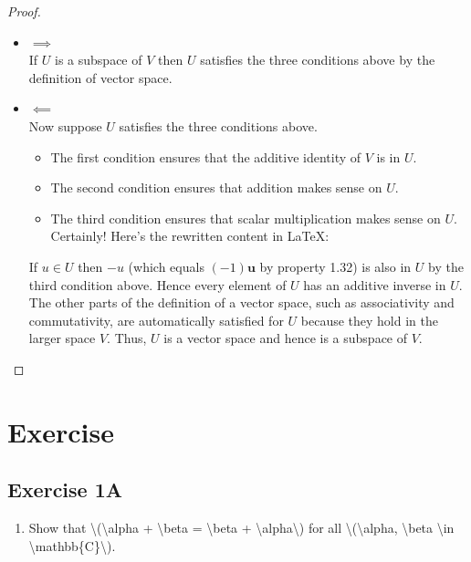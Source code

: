 \documentclass[
]{book}
\providecommand{\tightlist}{%
  \setlength{\itemsep}{0pt}\setlength{\parskip}{0pt}}
\theoremstyle{definition}
\theoremstyle{definition}
\theoremstyle{definition}
\theoremstyle{definition}
\theoremstyle{remark}
\begin{document}
\begin{proof}
\leavevmode

\begin{itemize}
\item
  \(\implies\)\\
  If \(U\) is a subspace of \(V\) then \(U\)
  satisfies the three conditions above by the
  definition of vector space.
\item
  \(\impliedby\)\\
  Now suppose \(U\) satisfies the three conditions above.

  \begin{itemize}
  \tightlist
  \item
    The first condition ensures that the additive identity of \(V\) is in \(U\).
  \item
    The second condition ensures that addition makes sense on \(U\).
  \item
    The third condition ensures that scalar multiplication makes sense on \(U\).
    Certainly! Here's the rewritten content in LaTeX:
  \end{itemize}

  If \({u} \in U\) then \(-{u}\) (which equals \((-1)\mathbf{u}\) by property 1.32) is also in \(U\) by the third condition above. Hence every element of \(U\) has an additive inverse in \(U\). The other parts of the definition of a vector space, such as associativity and commutativity, are automatically satisfied for \(U\) because they hold in the larger space \(V\). Thus, \(U\) is a vector space and hence is a subspace of \(V\).
\end{itemize}

\end{proof}

\chapter{Exercise}\label{exercise}

\section{Exercise 1A}\label{exercise-1a}

\begin{enumerate}
\def\labelenumi{\arabic{enumi}.}
\tightlist
\item
  Show that \textbackslash(\textbackslash alpha + \textbackslash beta = \textbackslash beta + \textbackslash alpha\textbackslash) for all \textbackslash(\textbackslash alpha, \textbackslash beta \textbackslash in \textbackslash mathbb\{C\}\textbackslash).
\end{enumerate}
\end{document}
